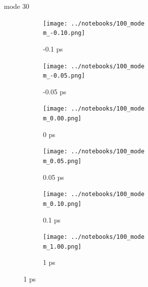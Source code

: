 \documentclass{beamer}
\newcommand\w{0.32}
\begin{document}
\renewcommand\m{30}
\begin{frame}{mode \m}
	\begin{figure}
		\centering
		\begin{subfigure}[b]{\w\textwidth}
			\centering
			\texttt{[image: ../notebooks/100\_mode\\m\_-0.10.png]}
			\caption{-0.1 ps}
		\end{subfigure}
		\begin{subfigure}[b]{\w\textwidth}
			\centering
			\texttt{[image: ../notebooks/100\_mode\\m\_-0.05.png]}
			\caption{-0.05 ps}
		\end{subfigure}
		\begin{subfigure}[b]{\w\textwidth}
			\centering
			\texttt{[image: ../notebooks/100\_mode\\m\_0.00.png]}
			\caption{0 ps}
		\end{subfigure}
		\begin{subfigure}[b]{\w\textwidth}
			\centering
			\texttt{[image: ../notebooks/100\_mode\\m\_0.05.png]}
			\caption{0.05 ps}
		\end{subfigure}
		\begin{subfigure}[b]{\w\textwidth}
			\centering
			\texttt{[image: ../notebooks/100\_mode\\m\_0.10.png]}
			\caption{0.1 ps}
		\end{subfigure}
		\begin{subfigure}[b]{\w\textwidth}
			\centering
			\texttt{[image: ../notebooks/100\_mode\\m\_1.00.png]}
			\caption{1 ps}
		\end{subfigure}
	\end{figure}
\end{frame}
\end{document}
